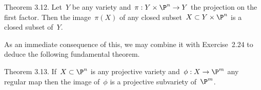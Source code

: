 \proclaim Theorem {3.12}. Let~$Y$ be any variety
and~$\pi:Y\times\P^n\to Y$ the projection on the first factor. Then
the image~$\pi(X)$ of any closed subset~$X\subset Y \times\P^n$ is a
closed subset of~$Y$.

As an immediate consequence of this, we may combine it with
Exercise~2.24 to deduce the following fundamental theorem.

\proclaim Theorem {3.13}. If~$X\subset\P^n$ is any projective variety
and~$\phi:X\to\P^m$ any regular map then the image of~$\phi$ is a
projective subvariety of~$\P^m$.


\vfill
\bye

